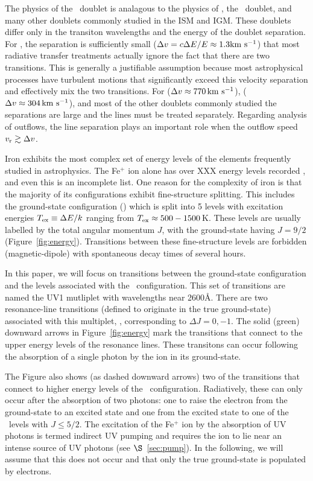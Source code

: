 \documentclass[12pt,preprint]{aastex}
\begin{document}
The physics of the \mgiid\ doublet
is analagous to the physics of 
\lya, the \naid\ doublet, and many other doublets commonly
studied in the ISM and IGM.  These doublets differ only in
the transiton wavelengths and the energy of the doublet separation. 
For  \lya, the
separation is sufficiently small ($\Delta v = c \Delta E / E \approx
1.3 {\rm km~s^{-1}}$) that most radiative transfer treatments actually ignore the fact that
there are two transitions.   This is generally a justifiable
assumption because 
most astrophysical processes have turbulent motions that
significantly exceed this velocity separation and effectively mix the
two transitions.  For  ($\Delta v \approx 770 \, {\rm km~s^{-1}}$),  
 ($\Delta v \approx 304 \, {\rm km~s^{-1}}$), and most of the other doublets
commonly studied the separations are large and the lines
must be treated separately.  Regarding analysis of outflows, the line
separation plays an important role when the outflow speed $v_{\rm r}
\gtrsim \Delta v$.

Iron exhibits the most complex set of energy levels of the elements
frequently studied in astrophysics.  The Fe$^+$ ion alone has over XXX
energy levels recorded \citep{iron}, and even this is an
incomplete list.  
One reason for the complexity of iron is
that the majority of its configurations exhibit fine-structure splitting.
This includes the ground-state configuration (\aconfig) which is split
into 5 levels with 
excitation energies $T_{\rm ex} \equiv \Delta E / k$ ranging from
$T_{\rm ex} \approx 500-1500$\,K.  These levels are usually labelled by the total angular momentum
$J$, with the ground-state having $J=9/2$ (Figure~\ref{fig:energy}).  
Transitions between these fine-structure levels are 
forbidden (magnetic-dipole) with spontaneous decay times of several hours.  

In this paper, we will focus on transitions between the ground-state
configuration and the levels associated with the \zconfig\
configuration.  This set of transitions are named the
UV1 mutliplet with wavelengths near 2600\AA.
There are two resonance-line transitions (defined to originate in the
true ground-state) associated with this multiplet, \feiid,
corresponding to $\Delta J = 0, -1$.  The solid (green) downward
arrows in Figure~\ref{fig:energy} mark the transitions that connect to
the upper energy levels of the resonance lines.  These transitons can
occur following the absorption of a single photon by the ion in its
ground-state.  

The Figure also shows (as dashed downward arrows) two of the
transitions that connect to higher energy levels of the \zconfig\
configuration.  Radiatively, these can only occur after the absorption
of two photons: one to raise the electron from the ground-state to an
excited state and one from the excited state to one of the \zconfig\
levels with $J \le 5/2$.  The excitation of the Fe$^+$ ion by the
absorption of UV photons is termed indirect UV pumping
\citep[e.g][]{sv02,pcb06} and requires the ion to lie
near an intense source of UV photons (see $\S$~\ref{sec:pump}).  In the
following, we will assume that this does not occur and that only the 
true ground-state is populated by electrons. 
\end{document}
